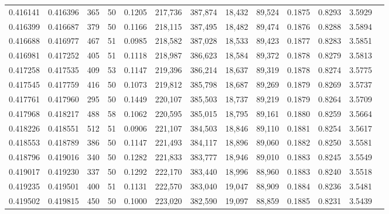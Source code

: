 \begin{tabular}{rrrrrrrrrrrrr}
0.416141 & 0.416396 &   365 &  50 &                                     0.1205 & 217,736 & 387,874 &  18,432 &  89,524 & 0.1875 & 0.8293 & 3.5929 \\
0.416399 & 0.416687 &   379 &  50 &                                     0.1166 & 218,115 & 387,495 &  18,482 &  89,474 & 0.1876 & 0.8288 & 3.5894 \\
0.416688 & 0.416977 &   467 &  51 &                                     0.0985 & 218,582 & 387,028 &  18,533 &  89,423 & 0.1877 & 0.8283 & 3.5851 \\
0.416981 & 0.417252 &   405 &  51 &                                     0.1118 & 218,987 & 386,623 &  18,584 &  89,372 & 0.1878 & 0.8279 & 3.5813 \\
0.417258 & 0.417535 &   409 &  53 &                                     0.1147 & 219,396 & 386,214 &  18,637 &  89,319 & 0.1878 & 0.8274 & 3.5775 \\
0.417545 & 0.417759 &   416 &  50 &                                     0.1073 & 219,812 & 385,798 &  18,687 &  89,269 & 0.1879 & 0.8269 & 3.5737 \\
0.417761 & 0.417960 &   295 &  50 &                                     0.1449 & 220,107 & 385,503 &  18,737 &  89,219 & 0.1879 & 0.8264 & 3.5709 \\
0.417968 & 0.418217 &   488 &  58 &                                     0.1062 & 220,595 & 385,015 &  18,795 &  89,161 & 0.1880 & 0.8259 & 3.5664 \\
0.418226 & 0.418551 &   512 &  51 &                                     0.0906 & 221,107 & 384,503 &  18,846 &  89,110 & 0.1881 & 0.8254 & 3.5617 \\
0.418553 & 0.418789 &   386 &  50 &                                     0.1147 & 221,493 & 384,117 &  18,896 &  89,060 & 0.1882 & 0.8250 & 3.5581 \\
0.418796 & 0.419016 &   340 &  50 &                                     0.1282 & 221,833 & 383,777 &  18,946 &  89,010 & 0.1883 & 0.8245 & 3.5549 \\
0.419017 & 0.419230 &   337 &  50 &                                     0.1292 & 222,170 & 383,440 &  18,996 &  88,960 & 0.1883 & 0.8240 & 3.5518 \\
0.419235 & 0.419501 &   400 &  51 &                                     0.1131 & 222,570 & 383,040 &  19,047 &  88,909 & 0.1884 & 0.8236 & 3.5481 \\
0.419502 & 0.419815 &   450 &  50 &                                     0.1000 & 223,020 & 382,590 &  19,097 &  88,859 & 0.1885 & 0.8231 & 3.5439 \\

\end{tabular}
